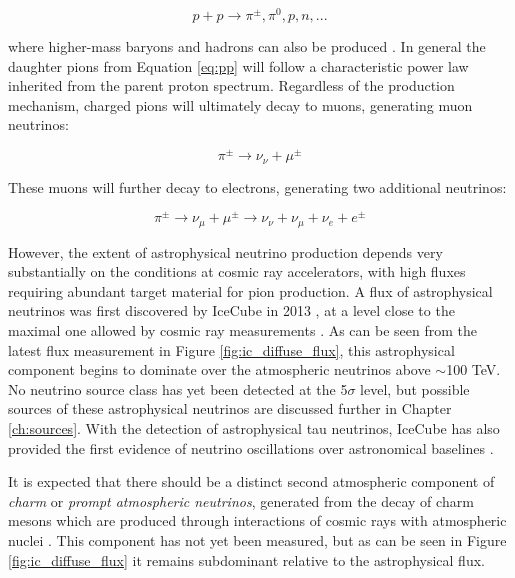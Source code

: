 \begin{equation}
	p + p \rightarrow \pi^{\pm}, \pi^{0}, p, n, ...
	\label{eq:pp}
\end{equation}

where higher-mass baryons and hadrons can also be produced \cite{spurio_18}. In general the daughter pions from Equation \ref{eq:pp} will follow a characteristic power law inherited from the parent proton spectrum. Regardless of the production mechanism, charged pions will ultimately decay to muons, generating muon neutrinos:

\begin{equation}
	\pi^{\pm} \rightarrow \nu_{\nu} + \mu^{\pm}
\end{equation}

These muons will further decay to electrons, generating two additional neutrinos:

\begin{equation}
	\pi^{\pm} \rightarrow \nu_{\mu} + \mu^{\pm} \rightarrow \nu_{\nu} + \nu_{\mu} + \nu_{e} + e^{\pm}
\end{equation}

However, the extent of astrophysical neutrino production depends very substantially on the conditions at cosmic ray accelerators, with high fluxes requiring abundant target material for pion production. A flux of astrophysical neutrinos was first discovered by IceCube in 2013 , at a level close to the maximal one allowed by cosmic ray measurements . As can be seen from the latest flux measurement in Figure \ref{fig:ic_diffuse_flux}, this astrophysical component begins to dominate over the atmospheric neutrinos above $\sim$100 TeV. No neutrino source class has yet been detected at the 5$\sigma$ level, but possible sources of these astrophysical neutrinos are discussed further in Chapter \ref{ch:sources}. With the detection of astrophysical tau neutrinos, IceCube has also provided the first evidence of neutrino oscillations over astronomical baselines .

It is expected that there should be a distinct second atmospheric component of \emph{charm} or \emph{prompt atmospheric neutrinos}, generated from the decay of charm mesons which are produced through interactions of cosmic rays with atmospheric nuclei \cite{spurio_18}. This component has not yet been measured, but as can be seen in Figure \ref{fig:ic_diffuse_flux} it remains subdominant relative to the astrophysical flux.

